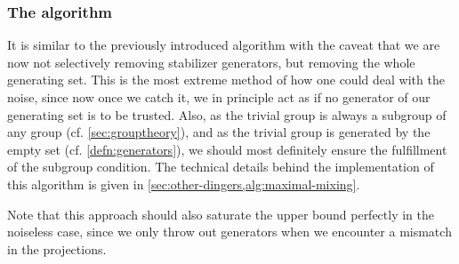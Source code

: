 \subsubsection{The algorithm}
It is
similar to the previously introduced algorithm with the caveat that we are now
not selectively removing stabilizer generators, but removing the whole
generating set. This is the most extreme method of how one could deal with the
noise, since now once we catch it, we in principle act as if no generator of
our generating set is to be trusted. Also, as the trivial group is always a
subgroup of any group (cf. \cref{sec:grouptheory}), and as the trivial group is
generated by the empty set (cf. \cref{defn:generators}), we should most
definitely ensure the fulfillment of the subgroup condition. The technical
details behind the implementation of this algorithm is given in
\cref{sec:other-dingers,alg:maximal-mixing}.

Note that this approach should also saturate the upper bound perfectly in the
noiseless case, since we only throw out generators when we encounter a mismatch
in the projections.



